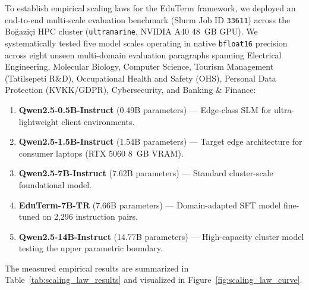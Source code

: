 \documentclass[a4paper,12pt]{report}
\begin{document}
To establish empirical scaling laws for the EduTerm framework, we deployed an end-to-end multi-scale evaluation benchmark (Slurm Job ID \texttt{33611}) across the Bo\u{g}azi\c{c}i HPC cluster (\texttt{ultramarine}, NVIDIA A40 48~GB GPU). We systematically tested five model scales operating in native \texttt{bfloat16} precision across eight unseen multi-domain evaluation paragraphs spanning Electrical Engineering, Molecular Biology, Computer Science, Tourism Management (Tatilsepeti R\&D), Occupational Health and Safety (OHS), Personal Data Protection (KVKK/GDPR), Cybersecurity, and Banking \& Finance:
\begin{enumerate}
    \item \textbf{Qwen2.5-0.5B-Instruct} (0.49B parameters) --- Edge-class SLM for ultra-lightweight client environments.
    \item \textbf{Qwen2.5-1.5B-Instruct} (1.54B parameters) --- Target edge architecture for consumer laptops (RTX 5060 8~GB VRAM).
    \item \textbf{Qwen2.5-7B-Instruct} (7.62B parameters) --- Standard cluster-scale foundational model.
    \item \textbf{EduTerm-7B-TR} (7.66B parameters) --- Domain-adapted SFT model fine-tuned on 2,296 instruction pairs.
    \item \textbf{Qwen2.5-14B-Instruct} (14.77B parameters) --- High-capacity cluster model testing the upper parametric boundary.
\end{enumerate}

The measured empirical results are summarized in Table~\ref{tab:scaling_law_results} and visualized in Figure~\ref{fig:scaling_law_curve}.
\end{document}
